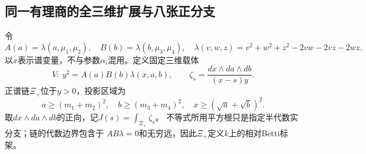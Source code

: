 \documentclass[11pt,a4paper]{ctexart}
\theoremstyle{cnplain}\newtheorem{theorem}{定理}[section]
\theoremstyle{definition}\newtheorem{definition}[theorem]{定义}
\theoremstyle{remark}\newtheorem{remark}[theorem]{注}
\begin{document}
\subsection{同一有理商的全三维扩展与八张正分支}
令
\[
 A(a)=\lambda(a,\mu_1,\mu_2),\quad B(b)=\lambda(b,\mu_3,\mu_4),\quad
 \lambda(v,w,z)=v^2+w^2+z^2-2vw-2vz-2wz.
\]
以$x$表示谱变量，不与参数$\alpha_i$混用。定义固定三维载体
\begin{equation}\label{eq:actualspectralcarrier}
 V:\ y^2=A(a)B(b)\lambda(x,a,b),\qquad
 \zeta_s=\frac{dx\wedge da\wedge db}{(x-s)y}.
\end{equation}
正谱链$\Xi_+$位于$y>0$，投影区域为
\[
 a\geq(m_1+m_2)^2,\quad b\geq(m_3+m_4)^2,\quad
 x\geq(\sqrt a+\sqrt b)^2.
\]
取$dx\wedge da\wedge db$的正向，记$J(s)=\int_{\Xi_+}\zeta_s$。
不等式所用平方根只是指定半代数实分支；链的代数边界包含于
$A B\lambda=0$和无穷远，因此$\Xi_+$定义$k$上的相对Betti标架。
\end{document}
